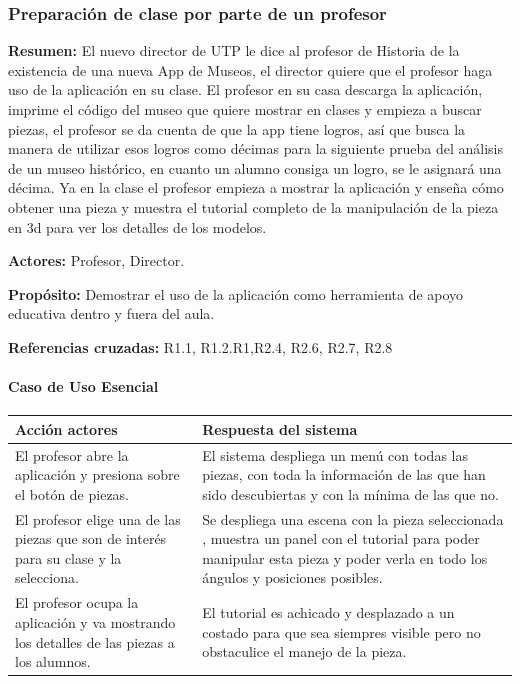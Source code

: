 \subsubsection{Preparación de clase por parte de un profesor}

{\textbf {Resumen:}}
El nuevo director de UTP le dice al profesor de Historia de la existencia de una nueva App de Museos, el director quiere que el profesor haga uso de la aplicación en su clase. El profesor en su casa descarga la aplicación, imprime el código del museo que quiere mostrar en clases y empieza a buscar piezas, el profesor se da cuenta de que la app tiene logros, así que busca la manera de utilizar esos logros como décimas para la siguiente prueba del análisis de un museo histórico, en cuanto un alumno consiga un logro, se le asignará una décima. Ya en la clase el profesor empieza a mostrar la aplicación y enseña cómo obtener una pieza y muestra el tutorial completo de la manipulación de la pieza en 3d para ver los detalles de los modelos.


{\textbf {Actores:}}
Profesor, Director.

{\textbf {Propósito:}}
Demostrar el uso de la aplicación como herramienta de apoyo educativa dentro y fuera del aula.

{\textbf {Referencias cruzadas:}}
R1.1, R1.2.R1,R2.4, R2.6, R2.7, R2.8

\paragraph{Caso de Uso Esencial}

\begin{longtable}{|p{5cm}|p{8cm}|}
\hline 
Acción actores & Respuesta del sistema \\ 
\hline 
El profesor abre la aplicación y presiona sobre el botón de piezas. & El sistema despliega un menú con todas las piezas, con toda la información de las que han sido descubiertas y con la mínima de las que no. \\ 
\hline
El profesor elige una de las piezas que son de interés para su clase y la selecciona. & Se despliega una escena con la pieza seleccionada , muestra un panel con el tutorial para poder manipular esta pieza y poder verla en todo los ángulos y posiciones posibles. \\ 
\hline 
El profesor ocupa la aplicación y va mostrando los detalles de las piezas a los alumnos. & El tutorial es achicado y desplazado a un costado para que sea siempres visible pero no obstaculice el manejo de la pieza. \\ 
\hline 
\end{longtable}

